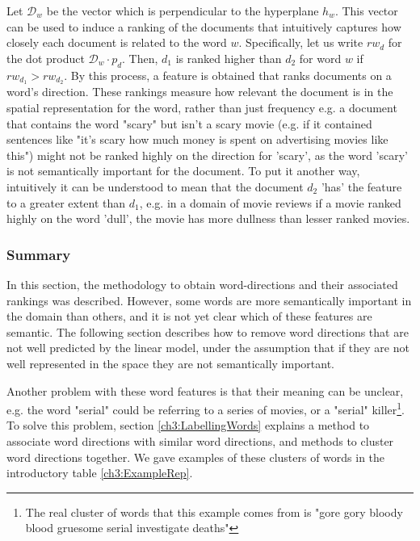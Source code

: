 Let $\mathcal{D}_w$ be the vector which is perpendicular to the hyperplane $h_w$. This vector can be used to induce a ranking of the documents that intuitively captures how closely each document is related to the word $w$. Specifically, let us write $rw_d$ for the dot product $\mathcal{D}_w\cdot p_d$.  Then, $d_1$ is ranked higher than $d_2$ for word $w$ if $rw_{d_1} > rw_{d_2}$. By this process, a feature is obtained that ranks documents on a word's direction. These rankings measure how relevant the document is in the spatial representation for the word, rather than just frequency e.g.  a document that contains the word "scary" but isn't a scary movie (e.g. if it contained sentences like "it's scary how much money is spent on advertising movies like this") might not be ranked highly on the direction for 'scary', as the word 'scary' is not semantically important for the document. To put it another way, intuitively it can be understood to mean that the document $d_2$ 'has' the feature  to a greater extent than $d_1$, e.g. in a domain of movie reviews if a movie ranked highly on the word 'dull', the movie has more dullness than lesser ranked movies. %

\subsubsection{Summary}

In this section, the methodology to obtain word-directions and their associated rankings was described. However, some words are more semantically important in the domain than others, and it is not yet clear which of these features are semantic. The following section describes how to remove word directions that are not well predicted by the linear model, under the assumption that if they are not well represented in the space they are not semantically important. 

Another problem with these word features  is that their meaning can be unclear, e.g. the word "serial" could be referring to a series of movies, or a "serial" killer\footnote{The real cluster of words that this example comes from is "gore gory bloody blood gruesome serial investigate deaths"}. To solve this problem, section \ref{ch3:LabellingWords} explains a method to associate word directions with similar word directions, and methods to cluster word directions together. We gave examples of these clusters of words in the introductory table \ref{ch3:ExampleRep}. %






